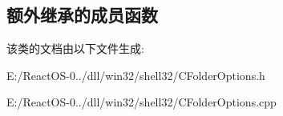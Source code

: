 \subsection*{额外继承的成员函数}


该类的文档由以下文件生成\+:\begin{DoxyCompactItemize}
\item 
E\+:/\+React\+O\+S-\/0../dll/win32/shell32/C\+Folder\+Options.\+h\item 
E\+:/\+React\+O\+S-\/0../dll/win32/shell32/C\+Folder\+Options.\+cpp\end{DoxyCompactItemize}

